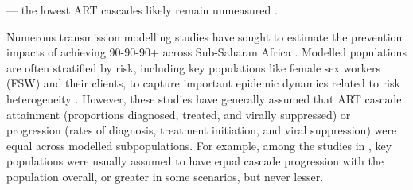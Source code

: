 --- \ie the lowest ART cascades likely remain unmeasured \cite{Hakim2018}.
\par
Numerous transmission modelling studies have sought to estimate
the prevention impacts of achieving 90-90-90+ across Sub-Saharan Africa
\cite{Eaton2012,Knight2022sr}.
Modelled populations are often stratified by risk,
including key populations like female sex workers (FSW) and their clients,
to capture important epidemic dynamics related to risk heterogeneity \cite{Watts2010}.
However, these studies have generally assumed that ART cascade
attainment (\ie proportions diagnosed, treated, and virally suppressed) or
progression (\ie rates of diagnosis, treatment initiation, and viral suppression)
were equal across modelled subpopulations.
For example, among the studies in \cite{Knight2022sr},
key populations were usually assumed to have
equal cascade progression with the population overall,
or greater in some scenarios, but never lesser.
